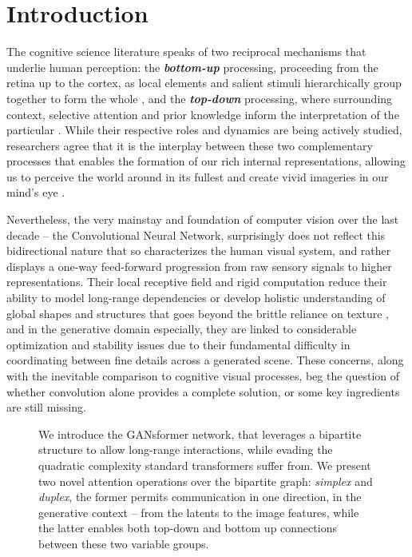 \documentclass{article}
\begin{document}
\vspace*{-18pt}
\section{Introduction}
\label{intro}
The cognitive science literature speaks of two reciprocal mechanisms that underlie human perception: the \textbf{\textit{bottom-up}} processing, proceeding from the retina up to the cortex, as local elements and salient stimuli hierarchically group together to form the whole \citep{gibson1,gibson2}, and the \textbf{\textit{top-down}} processing, where surrounding context, selective attention and prior knowledge inform the interpretation of the particular \citep{gregory1,gregory2}. While their respective roles and dynamics are being actively studied, researchers agree that it is the interplay between these two complementary processes that enables the formation of our rich internal representations, allowing us to perceive the world around in its fullest and create vivid imageries in our mind's eye \citep{vision1,vision2,vision3,vision4}.


Nevertheless, the very mainstay and foundation of computer vision over the last decade -- the Convolutional Neural Network, surprisingly does not reflect this bidirectional nature that so characterizes the human visual system, and rather displays a one-way feed-forward progression from raw sensory signals to higher representations. Their local receptive field and rigid computation reduce their ability to model long-range dependencies or develop holistic understanding of global shapes and structures that goes beyond the brittle reliance on texture \citep{texture}, and in the generative domain especially, they are linked to considerable optimization and stability issues \citep{resnet,sagan} due to their fundamental difficulty in coordinating between fine details across a generated scene. These concerns, along with the inevitable comparison to cognitive visual processes, beg the question of whether convolution alone provides a complete solution, or some key ingredients are still missing. 

\begin{figure*}[ht]
\centering
{}
\caption{We introduce the GANsformer network, that leverages a bipartite structure to allow long-range interactions, while evading the quadratic complexity standard transformers suffer from. We present two novel attention operations over the bipartite graph: \textit{simplex} and \textit{duplex}, the former permits communication in one direction, in the generative context -- from the latents to the image features, while the latter enables both top-down and bottom up connections between these two variable groups.}
\label{plots}
\vspace*{-8pt}
\end{figure*}
\end{document}
